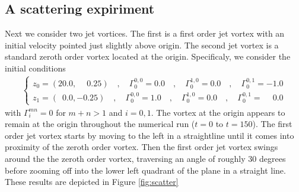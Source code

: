\documentclass[12pt]{amsart}
\theoremstyle{remark}
\begin{document}
\subsection{A scattering expiriment}
\label{sec:scattering}
Next we consider two jet vortices.  The first is a first order jet vortex with an initial velocity pointed just slightly above origin.
The second jet vortex is a standard zeroth order vortex located at the origin.
Specificaly, we consider the initial conditions
\begin{align}
	\begin{cases}
	z_0 = (20.0 , \phantom{-}0.25)\quad, \quad \Gamma_0^{0,0} = 0.0 \quad,\quad \Gamma_0^{1,0} = 0.0 \quad,\quad \Gamma_0^{0,1} = -1.0 \\
	z_1 = (\phantom{2}0.0 , -0.25)\quad, \quad \Gamma_0^{0,0} = 1.0 \quad,\quad \Gamma_0^{1,0} = 0.0 \quad,\quad \Gamma_0^{0,1} = \phantom{-}0.0
	\end{cases}
	\label{eq:ic}
\end{align}
with $\Gamma_i^{mn} = 0$ for $m+n > 1$ and $i=0,1$.
The vortex at the origin appears to remain at the origin throughout the numerical run ($t=0$ to $t=150$).
The first order jet vortex starts by moving to the left in a straightline until it comes into proximity of the zeroth order vortex.
Then the first order jet vortex swings around the the zeroth order vortex, traversing an angle of roughly 30 degrees
before zooming off into the lower left quadrant of the plane in a straight line.  These results are depicted in Figure \ref{fig:scatter}
\end{document}
